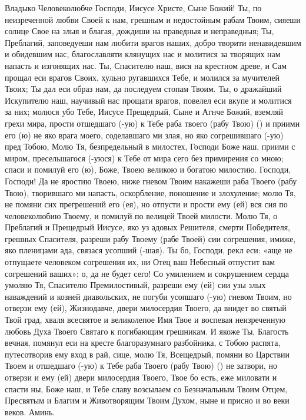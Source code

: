 \begin{mymulticols}

Владыко Человеколюбче Господи, Иисусе Христе, Сыне Божий! Ты, по неизреченной любви Своей к нам, грешным и недостойным рабам Твоим, сияеши солнце Свое на злыя и благая, дождиши на праведныя и неправедныя; Ты, Преблагий, заповедуеши нам любити врагов наших, добро творити ненавидевшим и обидевшим нас, благославляти клянущих нас и молитися за творящих нам напасть и изгонящих нас. Ты, Спасителю наш, вися на крестном древе, и Сам прощал еси врагов Своих, хульно ругавшихся Тебе, и молился за мучителей Твоих; Ты дал еси образ нам, да последуем стопам Твоим. Ты, о дражайший Искупителю наш, научивый нас прощати врагов, повелел еси вкупе и молитися за них; молюся убо Тебе, Иисусе Прещедрый, Сыне и Агнче Божий, вземляй грехи мира, прости отшедшаго (-ую) к Тебе раба твоего (рабу Твою) () и приими его (ю) не яко врага моего, соделавшаго ми злая, но яко согрешившаго (-ую) пред Тобою, Молю Тя, безпредельный в милостех, Господи Боже наш, приими с миром, пресельшагося (-уюся) к Тебе от мира сего без примирения со мною; спаси и помилуй его (ю), Боже, Твоею великою и богатою милостию. Господи, Господи! Да не яростию Твоею, ниже гневом Твоим накажеши раба Твоего (рабу Твою), творившаго ми напасть, оскорбление, поношение и злохуление; молю Тя, не помяни сих прегрешений его (ея), но отпусти и прости ему (ей) вся сия по человеколюбию Твоему, и помилуй по велицей Твоей милости. Молю Тя, о Преблагий и Прещедрый Иисусе, яко уз адовых Решителя, смерти Победителя, грешных Спасителя, разреши рабу Твоему (рабе Твоей) сии согрешения, имиже, яко пленицами ада, связася усопший (-шая). Ты бо, Господи, рекл еси: «аще не отпущаете человеком согрешения их, ни Отец ваш Небесный отпустит вам согрешений ваших»; о, да не будет сего! Со умилением и сокрушением сердца умоляю Тя, Спасителю Премилостивый, разреши ему (ей) сии узы злых наваждений и козней диавольских, не погуби усопшаго (-ую) гневом Твоим, но отверзи ему (ей), Жизнодавче, двери милосердия Твоего, да внидет во святый Твой град, хваля всесвятое и великолепое Имя Твое и воспевая неизреченную любовь Духа Твоего Святаго к погибающим грешникам. И якоже Ты, Благость вечная, помянул еси на кресте благоразумнаго разбойника, с Тобою распята, путесотворив ему вход в рай, сице, молю Тя, Всещедрый, помяни во Царствии Твоем и отшедшаго (-ую) к Тебе раба Твоего (рабу Твою) () не затвори, но отверзи и ему (ей) двери милосердия Твоего, Твое бо есть, еже миловати и спасти ны, Боже наш, и Тебе славу возсылаем со Безначальным Твоим Отцем, Пресвятым и Благим и Животворящим Твоим Духом, ныне и присно и во веки веков. Аминь. 

\end{mymulticols}

